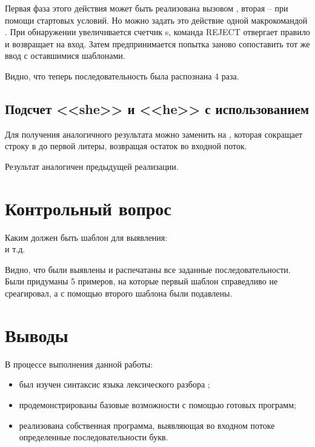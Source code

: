 Первая фаза этого действия может быть реализована вызовом , вторая -- при помощи стартовых условий. Но можно задать это действие одной макрокомандой . При обнаружении  увеличивается счетчик s, команда REJECT отвергает правило и возвращает  на вход. Затем предпринимается попытка заново сопоставить тот же ввод с оставшимися шаблонами.



Видно, что теперь последовательность  была распознана 4 раза.

\subsection{Подсчет <<she>> и <<he>> с использованием }

Для получения аналогичного результата можно заменить  на , которая сокращает строку в  до первой литеры, возвращая остаток во входной
поток.



Результат аналогичен предыдущей реализации.

\newpage

\section{Контрольный вопрос}

Каким должен быть шаблон для выявления:    \\  и т.д.



Видно, что были выявлены и распечатаны все заданные последовательности. Были придуманы 5 примеров, на которые первый шаблон справедливо не среагировал, а с помощью второго шаблона были подавлены.

\section{Выводы}

В процессе выполнения данной работы:

\begin{itemize}
	\item был изучен синтаксис языка лексического разбора ;
	\item продемонстрированы базовые возможности  с помощью готовых программ;
	\item реализована собственная программа, выявляющая во входном потоке определенные последовательности букв.
\end{itemize}


